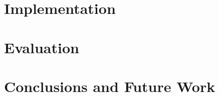 \documentclass[sigconf]{acmart}
\begin{document}
\section{Implementation}


\section{Evaluation}


\section{Conclusions and Future Work}


\balance


\end{document}
